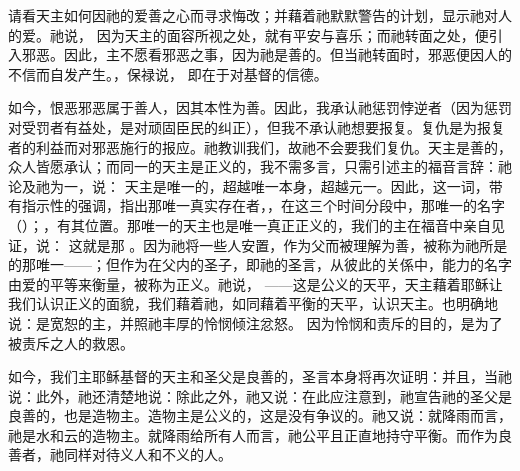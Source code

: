 请看天主如何因祂的爱善之心而寻求悔改；并藉着祂默默警告的计划，显示祂对人的爱。祂说， 因为天主的面容所视之处，就有平安与喜乐；而祂转面之处，便引入邪恶。因此，主不愿看邪恶之事，因为祂是善的。但当祂转面时，邪恶便因人的不信而自发产生。，保禄说， 即在于对基督的信德。\par

如今，恨恶邪恶属于善人，因其本性为善。因此，我承认祂惩罚悖逆者（因为惩罚对受罚者有益处，是对顽固臣民的纠正），但我不承认祂想要报复。复仇是为报复者的利益而对邪恶施行的报应。祂教训我们，故祂不会要我们复仇。天主是善的，众人皆愿承认；而同一的天主是正义的，我不需多言，只需引述主的福音言辞：祂论及祂为一，说： 天主是唯一的，超越唯一本身，超越元一。因此，这一词，带有指示性的强调，指出那唯一真实存在者，，在这三个时间分段中，那唯一的名字（）；，有其位置。那唯一的天主也是唯一真正正义的，我们的主在福音中亲自见证，说： 这就是那 。因为祂将一些人安置，作为父而被理解为善，被称为祂所是的那唯一——；但作为在父内的圣子，即祂的圣言，从彼此的关係中，能力的名字由爱的平等来衡量，被称为正义。祂说， ——这是公义的天平，天主藉着耶稣让我们认识正义的面貌，我们藉着祂，如同藉着平衡的天平，认识天主。也明确地说：是宽恕的主，并照祂丰厚的怜悯倾注忿怒。 因为怜悯和责斥的目的，是为了被责斥之人的救恩。\par

如今，我们主耶稣基督的天主和圣父是良善的，圣言本身将再次证明：并且，当祂说：此外，祂还清楚地说：除此之外，祂又说：在此应注意到，祂宣告祂的圣父是良善的，也是造物主。造物主是公义的，这是没有争议的。祂又说：就降雨而言，祂是水和云的造物主。就降雨给所有人而言，祂公平且正直地持守平衡。而作为良善者，祂同样对待义人和不义的人。\par

